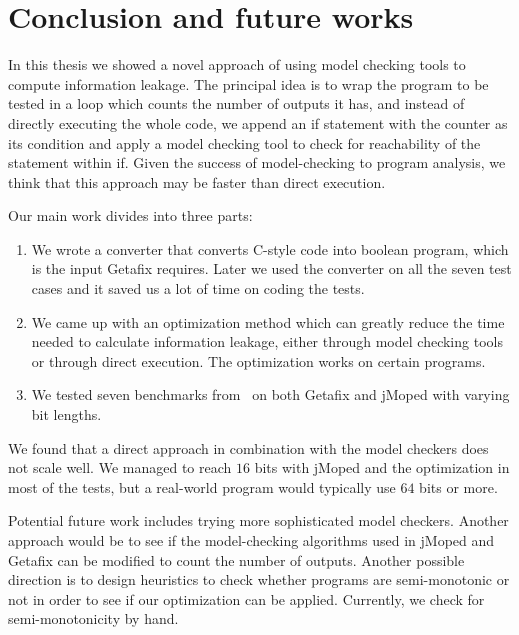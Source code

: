 
\chapter{Conclusion and future works}
	\label{CH_summary}

In this thesis we showed a novel approach of using model checking tools to compute information leakage. The principal idea is to wrap the program to be tested in a loop which counts the number of outputs it has, and instead of directly executing the whole code, we append an if statement with the counter as its condition and apply a model checking tool to check for reachability of the statement within if. Given the success of model-checking to program analysis, we think that this approach may be faster than direct execution.

Our main work divides into three parts:
\begin{enumerate}
\item We wrote a converter that converts C-style code into boolean program, which is the input Getafix requires. Later we used the converter on all the seven test cases and it saved us a lot of time on coding the tests. 
\item We came up with an optimization method which can greatly reduce the time needed to calculate information leakage, either through model checking tools or through direct execution. The optimization works on certain programs. 

\item We tested seven benchmarks from~\cite{Smith} on both Getafix and jMoped with varying bit lengths.
\end{enumerate}

We found that a direct approach in combination with the model checkers does not scale well. We managed to reach $16$ bits with jMoped and the optimization in most of the tests, but a real-world program would typically use $64$ bits or more. 


Potential future work includes trying more sophisticated model checkers. Another approach would be to see if the model-checking algorithms  used in jMoped and Getafix can be modified to count the number of outputs. Another possible direction is to design heuristics to check whether programs are semi-monotonic or not in order to see if our optimization can be applied. Currently, we check for semi-monotonicity by hand. 
